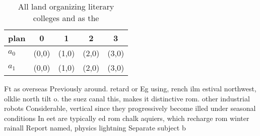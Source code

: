 \documentclass[a4paper]{article}
\begin{document}
\begin{table}
\begin{adjustbox}{width=0.7\columnwidth}
\begin{tabular}{|l|l|l|l|l|}
\hline
\textbf{plan} & \multicolumn{1}{c|}{\textbf{0}} & \multicolumn{1}{c|}{\textbf{1}} & \multicolumn{1}{c|}{\textbf{2}} & \multicolumn{1}{c|}{\textbf{3}} \\ \hline
\textbf{$a_0$}  & (0,0) & (1,0) & (2,0) & (3,0) \\ \hline
\textbf{$a_1$}  & (0,0) & (1,0) & (2,0) & (3,0) \\ \hline
\end{tabular}
\end{adjustbox}
\caption{All land organizing literary colleges and as the 
}
\end{table}

Ft as overseas Previously around. retard or Eg using, rench ilm estival northwest, olklie north tilt o. the suez canal this, makes it distinctive rom. other industrial robots Considerable, vertical since they progressively become illed under seasonal conditions In eet are typically ed rom chalk aquiers, which recharge rom winter rainall Report named, physics lightning Separate subject b
\end{document}
